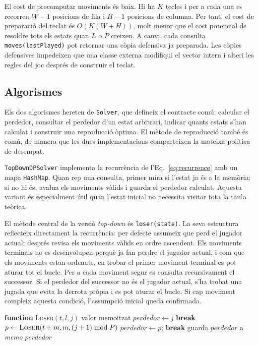 \documentclass[conference,compsoc]{IEEEtran}
\begin{document}
El cost de precomputar moviments és baix. Hi ha $K$ tecles i per a cada una es
recorren $W-1$ posicions de fila i $H-1$ posicions de columna. Per tant, el cost
de preparació del teclat és $O(K(W+H))$, molt menor que el cost potencial de
resoldre tots els estats quan $L$ o $P$ creixen. A canvi, cada consulta
\texttt{moves(lastPlayed)} pot retornar una còpia defensiva ja preparada. Les
còpies defensives impedeixen que una classe externa modifiqui el vector intern i
alteri les regles del joc després de construir el teclat.

\subsection{Algorismes}

Els dos algorismes hereten de \texttt{Solver}, que defineix el contracte comú:
calcular el perdedor, consultar el perdedor d'un estat arbitrari, indicar quants
estats s'han calculat i construir una reproducció òptima. El mètode de
reproducció també és comú, de manera que les dues implementacions comparteixen
la mateixa política de desempat.

\texttt{TopDownDPSolver} implementa la recurrència de l'Eq.~\ref{eq:recurrence}
amb un mapa \texttt{HashMap}. Quan rep una consulta, primer mira si
l'estat ja és a la memòria; si no hi és, avalua els moviments vàlids i guarda el
perdedor calculat. Aquesta variant és especialment útil quan l'estat inicial no
necessita visitar tota la taula teòrica.

El mètode central de la versió \textit{top-down} és \texttt{loser(state)}. La seva
estructura reflecteix directament la recurrència: per defecte assumeix que perd
el jugador actual; després revisa els moviments vàlids en ordre ascendent. Els
moviments terminals no es desenvolupen perquè ja fan perdre el jugador actual, i
com que els moviments estan ordenats, en trobar el primer moviment terminal es pot
aturar tot el bucle.
Per a cada moviment segur es consulta recursivament el successor. Si el perdedor
del successor no és el jugador actual, s'ha trobat una jugada que evita la derrota
pròpia i es pot aturar el bucle. Si cap moviment compleix aquesta condició,
l'assumpció inicial queda confirmada.

\begin{algorithm}[H]
\caption{Esquema de l'algorisme top-down.}
\label{alg:topdown}
\begin{algorithmic}[1]
\STATE \textbf{function} \textsc{Loser}$(t,l,j)$
    \RETURN valor memoitzat
\ENDIF
\STATE $perdedor \leftarrow j$
        \STATE \textbf{break}
    \ENDIF
    \STATE $p \leftarrow \textsc{Loser}(t+m,m,(j+1)\bmod P)$
        \STATE $perdedor \leftarrow p$; \textbf{break}
    \ENDIF
\ENDFOR
\STATE guarda $perdedor$ a \textit{memo}
\RETURN $perdedor$
\end{algorithmic}
\end{algorithm}
\end{document}
